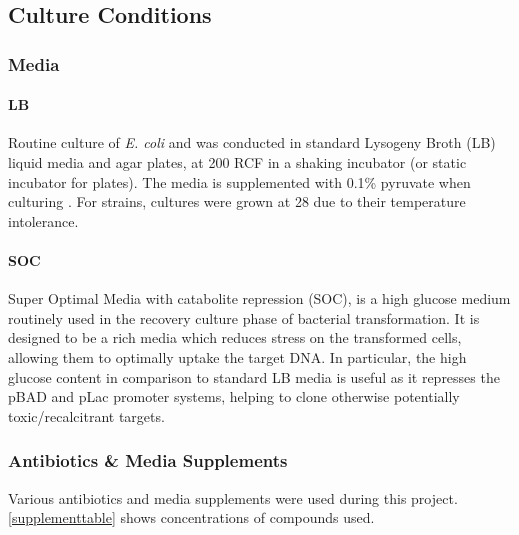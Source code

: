 \subsection{Culture Conditions}
	\subsubsection{Media}
		\paragraph{LB}
		Routine culture of \emph{E. coli} and \Pa{} was conducted in standard Lysogeny Broth (LB) liquid media and agar plates, at 200 RCF in a shaking incubator (or static incubator for plates). The media is supplemented with 0.1\% pyruvate when culturing \Pa. For \Plum{} strains, cultures were grown at 28\degC{} due to their temperature intolerance.
		\paragraph{SOC}
		Super Optimal Media with catabolite repression (SOC), is a high glucose medium routinely used in the recovery culture phase of bacterial transformation. It is designed to be a rich media which reduces stress on the transformed cells, allowing them to optimally uptake the target DNA. In particular, the high glucose content in comparison to standard LB media is useful as it represses the pBAD and pLac promoter systems, helping to clone otherwise potentially toxic/recalcitrant targets.

	\subsubsection{Antibiotics \& Media Supplements}\label{Antibiotics}
	Various antibiotics and media supplements were used during this project. \vref{supplementtable} shows concentrations of compounds used.
	
